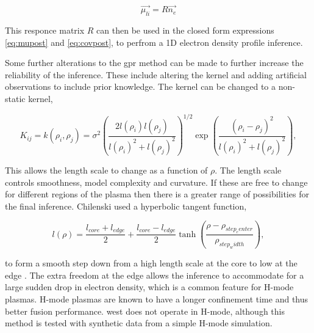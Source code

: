 \begin{equation}
  \vec{\mu_{li}} = R \vec{n_e}
\end{equation}

\noindent This responce matrix $R$ can then be used in the closed form expressions \ref{eq:mupost} and \ref{eq:covpost}, to perfrom a 1D electron density profile inference.

Some further alterations to the \gls{gpr} method can be made to further increase the reliability of the inference. These include altering the kernel and adding artificial observations to include prior knowledge. The kernel can be changed to a non-static kernel, 

\begin{equation}
  K_{ij} = k(\rho_i, \rho_j) = \sigma^2 \left( \frac{2l(\rho_i)l(\rho_j)}{l(\rho_i)^2 + l(\rho_j)^2} \right)^{1/2} \exp\left({\frac{(\rho_i - \rho_j)^2}{l(\rho_i)^2+l(\rho_j)^2}}\right),
\end{equation}

\noindent This allows the length scale to change as a function of $\rho$. The length scale controls smoothness, model complexity and curvature. If these are free to change for different regions of the plasma then there is a greater range of possibilities for the final inference. Chilenski used a hyperbolic tangent function,

\begin{equation}
  l(\rho) = \frac{l_{core} + l_{edge}}{2} + \frac{l_{core} - l_{edge}}{2} \tanh\left(\frac{\rho-\rho_{step_center}}{\rho_{step_width}}\right),
  \label{eq:smoothstep}
\end{equation}

\noindent to form a smooth step down from a high length scale at the core to low at the edge \cite{chilenski}. The extra freedom at the edge allows the inference to accommodate for a large sudden drop in electron density, which is a common feature for H-mode plasmas. H-mode plasmas are known to have a longer confinement time and thus better fusion performance. \gls{west} does not operate in H-mode, although this method is tested with synthetic data from a simple H-mode simulation.

